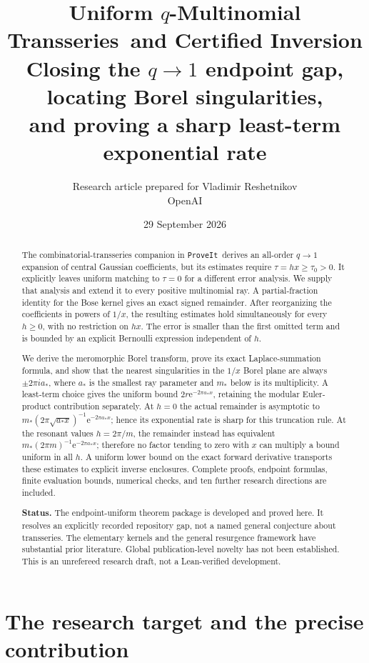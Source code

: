 \documentclass[11pt,a4paper]{article}
\title{\textbf{Uniform $q$-Multinomial Transseries\ and Certified Inversion}\\[5pt]
\large Closing the $q\to1$ endpoint gap, locating Borel singularities,\\
and proving a sharp least-term exponential rate}
\author{Research article prepared for Vladimir Reshetnikov\\
\small OpenAI}
\date{29 September 2026}
\numberwithin{equation}{section}
\theoremstyle{definition}\newtheorem{definition}[theorem]{Definition}
\theoremstyle{remark}\newtheorem{remark}[theorem]{Remark}
\newcommand{\e}{\mathrm e}
\newcommand{\repo}{\texttt{ProveIt}}
\begin{document}
\maketitle
\begin{abstract}
The combinatorial-transseries companion in \repo\ derives an all-order
$q\to1$ expansion of central Gaussian coefficients, but its estimates require
$\tau=hx\ge\tau_0>0$. It explicitly leaves uniform matching to $\tau=0$
for a different error analysis. We supply that analysis and extend it to every
positive multinomial ray. A partial-fraction identity for the Bose kernel gives
an exact signed remainder. After reorganizing the coefficients in powers of
$1/x$, the resulting estimates hold simultaneously for every $h\ge0$, with no
restriction on $hx$. The error is smaller than the first omitted term and is
bounded by an explicit Bernoulli expression independent of $h$.

We derive the meromorphic Borel transform, prove its exact Laplace-summation
formula, and show that the nearest singularities in the $1/x$ Borel plane are
always $\pm2\pi i a_*$, where $a_*$ is the smallest ray parameter and $m_*$ below is its multiplicity. A least-term
choice gives the uniform bound $2r\e^{-2\pi a_*x}$, retaining the modular
Euler-product contribution separately. At $h=0$ the actual remainder is
asymptotic to $m_*(2\pi\sqrt{a_*x})^{-1}\e^{-2\pi a_*x}$; hence its exponential
rate is sharp for this truncation rule. At the resonant values $h=2\pi/m$,
the remainder instead has equivalent $m_*(2\pi m)^{-1}\e^{-2\pi a_*x}$;
therefore no factor tending to zero with $x$ can multiply a bound uniform
in all $h$. A uniform lower bound on the exact
forward derivative transports these estimates to explicit inverse enclosures.
Complete proofs, endpoint formulas, finite evaluation bounds, numerical
checks, and ten further research directions are included.

\medskip\noindent
\textbf{Status.} The endpoint-uniform theorem package is developed and proved
here. It resolves an explicitly recorded repository gap, not a named general
conjecture about transseries. The elementary kernels and the general resurgence
framework have substantial prior literature. Global publication-level novelty
has not been established. This is an unrefereed research draft, not a
Lean-verified development.
\end{abstract}
\clearpage
\begingroup
\small
\setlength{\parskip}{0pt}
\tableofcontents
\endgroup
\newpage

\section{The research target and the precise contribution}
\label{sec:target}
\end{document}

